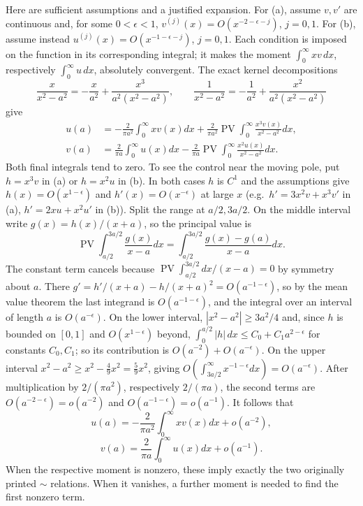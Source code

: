 Here are sufficient assumptions and a justified expansion. For (a),
assume $v,v'$ are continuous and, for some $0<\epsilon<1$,
$v^{(j)}(x)=O(x^{-2-\epsilon-j})$, $j=0,1$.
For (b), assume instead
$u^{(j)}(x)=O(x^{-1-\epsilon-j})$, $j=0,1$.
Each condition is imposed on the function in its corresponding integral;
it makes the moment $\int_0^\infty xv\,dx$, respectively
$\int_0^\infty u\,dx$, absolutely convergent.
The exact kernel decompositions
\[
\frac x{x^2-a^2}=-\frac x{a^2}+\frac{x^3}{a^2(x^2-a^2)},\qquad
\frac1{x^2-a^2}=-\frac1{a^2}+\frac{x^2}{a^2(x^2-a^2)}
\]
give
\begin{align*}
u(a)&=-\frac2{\pi a^2}\int_0^\infty xv(x)dx
 +\frac2{\pi a^2}\operatorname{PV}\int_0^\infty
       \frac{x^3v(x)}{x^2-a^2}dx,\\
v(a)&=\frac2{\pi a}\int_0^\infty u(x)dx
 -\frac2{\pi a}\operatorname{PV}\int_0^\infty
       \frac{x^2u(x)}{x^2-a^2}dx.
\end{align*}
Both final integrals tend to zero. To see the control near the moving
pole, put $h=x^3v$ in (a) or $h=x^2u$ in (b). In both cases $h$ is
$C^1$ and the assumptions give $h(x)=O(x^{1-\epsilon})$ and
$h'(x)=O(x^{-\epsilon})$ at large $x$ (e.g.\ $h'=3x^2v+x^3v'$ in (a),
$h'=2xu+x^2u'$ in (b)). Split the range at $a/2,3a/2$. On the middle
interval write $g(x)=h(x)/(x+a)$, so the principal value is
\[
\operatorname{PV}\int_{a/2}^{3a/2}\frac{g(x)}{x-a}dx
=\int_{a/2}^{3a/2}\frac{g(x)-g(a)}{x-a}dx.
\]
The constant term cancels because
$\operatorname{PV}\int_{a/2}^{3a/2}dx/(x-a)=0$ by symmetry about $a$.
There $g'=h'/(x+a)-h/(x+a)^2=O(a^{-1-\epsilon})$, so by the mean value
theorem the last integrand is $O(a^{-1-\epsilon})$, and the integral
over an interval of length $a$ is $O(a^{-\epsilon})$.
On the lower interval, $|x^2-a^2|\ge3a^2/4$ and, since $h$ is bounded on
$[0,1]$ and $O(x^{1-\epsilon})$ beyond,
$\int_0^{a/2}|h|\,dx\le C_0+C_1a^{2-\epsilon}$ for constants
$C_0,C_1$; so its contribution is $O(a^{-2})+O(a^{-\epsilon})$. On
the upper interval $x^2-a^2\ge x^2-\frac49x^2=\frac59x^2$, giving
$O(\int_{3a/2}^\infty x^{-1-\epsilon}dx)=O(a^{-\epsilon})$.
After multiplication by $2/(\pi a^2)$, respectively $2/(\pi a)$, the
second terms are $O(a^{-2-\epsilon})=o(a^{-2})$ and
$O(a^{-1-\epsilon})=o(a^{-1})$. It follows that
\[
\boxed{u(a)=-\frac2{\pi a^2}\int_0^\infty xv(x)dx+o(a^{-2})},
\]
\[
\boxed{v(a)=\frac2{\pi a}\int_0^\infty u(x)dx+o(a^{-1})}.
\]
When the respective moment is nonzero, these imply exactly the two
originally printed $\sim$ relations. When it vanishes, a further moment is
needed to find the first nonzero term.

